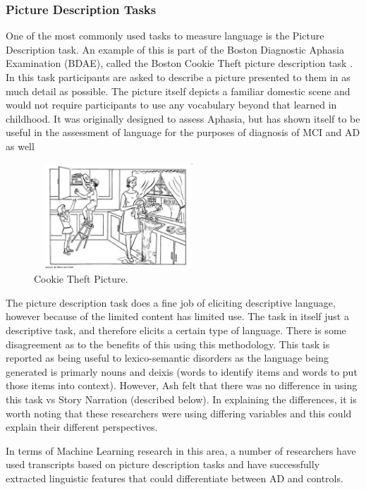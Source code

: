 \documentclass{article}
\begin{document}
\subsubsection{Picture Description Tasks}
One of the most commonly used tasks to measure language is the Picture Description task. An example of this is part of the Boston Diagnostic Aphasia Examination (BDAE), called the Boston Cookie Theft picture description task \cite{Kaplan2010}. In this task participants are asked to describe a picture presented to them in as much detail as possible. The picture itself depicts a familiar domestic scene and would not require participants to use any vocabulary beyond that learned in childhood. It was originally designed to assess Aphasia, but has shown itself to be useful in the assessment of language for the purposes of diagnosis of MCI and AD as well \cite{Giles1996}\newline
\begin{figure}[H]
\centering
\includegraphics[width=240px, height=150px]{BCTPicture.png}
\caption{Cookie Theft Picture.\label{white}}
\end{figure}
\par
The picture description task does a fine job of eliciting descriptive language, however because of the limited content has limited use. The task in itself just a descriptive task, and therefore elicits a certain type of language. There is some disagreement as to the benefits of this using this methodology. This task is reported as being useful to lexico-semantic disorders \cite{Boschi2017, Sajjadi2012} as the language being generated is primarly nouns and deixis (words to identify items and words to put those items into context). However, Ash \cite{Ash2012}felt that there was no difference in using this task vs Story Narration (described below). In explaining the differences, it is worth noting that these researchers were using differing variables and this could explain their different perspectives. \newline
\par
In terms of Machine Learning research in this area, a number of researchers have used transcripts based on picture description tasks \cite{Zimmerer2016, Orimaye2017, Mueller2018a, Fraser2015} and have successfully extracted linguistic features that could differentiate between AD and controls.\newline
\par
\end{document}
